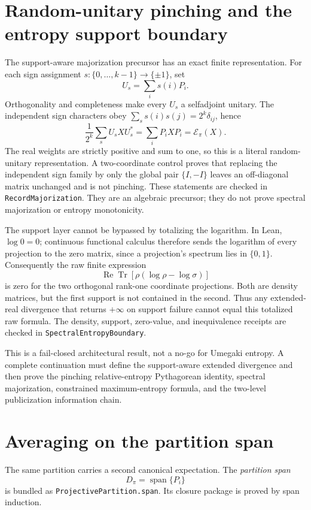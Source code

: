 \documentclass[11pt]{article}
\renewcommand{\_}{\textunderscore\allowbreak}
\theoremstyle{remark}
\newcommand{\Tr}{\operatorname{Tr}}
\newcommand{\pinch}{\mathcal E}
\begin{document}
\section{Random-unitary pinching and the entropy support boundary}
\label{sec:spectral-boundary}

The support-aware majorization precursor has an exact finite representation. For
each sign assignment \(s:\{0,\ldots,k-1\}\to\{\pm1\}\), set
\[
 U_s=\sum_i s(i)P_i .
\]
Orthogonality and completeness make every \(U_s\) a selfadjoint unitary. The
independent sign characters obey
\(\sum_s s(i)s(j)=2^k\delta_{ij}\), hence
\[
 \frac1{2^k}\sum_s U_s X U_s^*=\sum_iP_iXP_i=\pinch_\pi(X).
\]
The real weights are strictly positive and sum to one, so this is a literal
random-unitary representation. A two-coordinate control proves that replacing
the independent sign family by only the global pair \(\{I,-I\}\) leaves an
off-diagonal matrix unchanged and is not pinching. These statements are
checked in \texttt{RecordMajorization}. They are an algebraic precursor;
they do not prove spectral majorization or entropy monotonicity.

The support layer cannot be bypassed by totalizing the logarithm. In Lean,
\(\log 0=0\); continuous functional calculus therefore sends the logarithm
of every projection to the zero matrix, since a projection's spectrum lies
in \(\{0,1\}\). Consequently the raw finite expression
\[
 \operatorname{Re}\Tr\!\left[\rho(\log\rho-\log\sigma)\right]
\]
is zero for the two orthogonal rank-one coordinate projections. Both are
density matrices, but the first support is not contained in the second.
Thus any extended-real divergence that returns \(+\infty\) on support failure
cannot equal this totalized raw formula. The density, support, zero-value, and
inequivalence receipts are checked in
\texttt{SpectralEntropyBoundary}.

This is a fail-closed architectural result, not a no-go for Umegaki entropy.
A complete continuation must define the support-aware extended divergence and
then prove the pinching relative-entropy Pythagorean identity, spectral
majorization, constrained maximum-entropy formula, and the two-level
publicization information chain.

\section{Averaging on the partition span}
\label{sec:average}

The same partition carries a second canonical expectation. The
\emph{partition span}
\[
 D_\pi=\operatorname{span}\{P_i\}
\]
is bundled as \texttt{ProjectivePartition.span}. Its closure package is
proved by span induction.
\end{document}
